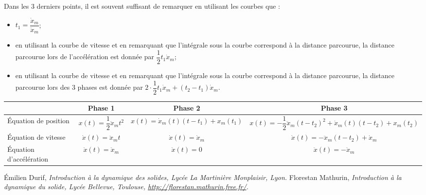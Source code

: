 \begin{resultat}
Dans les 3 derniers points, il est souvent suffisant de remarquer en utilisant les courbes que : 
\begin{itemize}
\item $t_1=\dfrac{\dot{x}_m}{\ddot{x}_m}$;
\item en utilisant la courbe de vitesse et en remarquant que l'intégrale sous la courbe correspond à la distance parcourue, la distance parcourue lors de l'accélération est donnée par $\dfrac{1}{2}t_1\dot{x}_m$;
\item en utilisant la courbe de vitesse et en remarquant que l'intégrale sous la courbe correspond à la distance parcourue, la distance parcourue lors des 3 phases est donnée par $2\cdot \dfrac{1}{2}t_1\dot{x}_m+\left(t_2-t_1\right)\dot{x}_m$.
\end{itemize}
\end{resultat}


\begin{center}
\begin{tabular}{|p{2.2cm}|c|c|c|}
\hline
 & Phase 1 & Phase 2 & Phase 3 \\
\hline \hline
Équation de position & 
$x(t)=\dfrac{1}{2}\ddot{x}_mt^2 $ &
$x(t)= \dot{x}_m(t)\left( t-t_1\right)+x_m\left(t_1 \right)$ & 
$x(t)= -\dfrac{1}{2}\ddot{x}_m\left(t-t_2\right)^2 + \dot{x}_m(t)\left( t-t_2\right)+x_m\left(t_2\right)$ \\ \hline
Équation de vitesse &
$\dot{x}(t)=\ddot{x}_m t$ &  
$\dot{x}(t)=\dot{x}_m $ & 
$\dot{x}(t)=-\ddot{x}_m \left(t-t_2\right)+\dot{x}_m$  \\ \hline
Équation d'accélération &
$\ddot{x}(t)=\ddot{x}_m$ & 
$\ddot{x}(t)=0$ & 
$\ddot{x}(t)=-\ddot{x}_m$ \\
\hline
\end{tabular}
\end{center}

\begin{thebibliography}{2}
    Émilien Durif, {\it Introduction à la dynamique des solides, Lycée La Martinière Monplaisir, Lyon.}
    Florestan Mathurin, {\it Introduction à la dynamique du solide, Lycée Bellevue, Toulouse, \url{http://florestan.mathurin.free.fr/}.}
\end{thebibliography}

%



